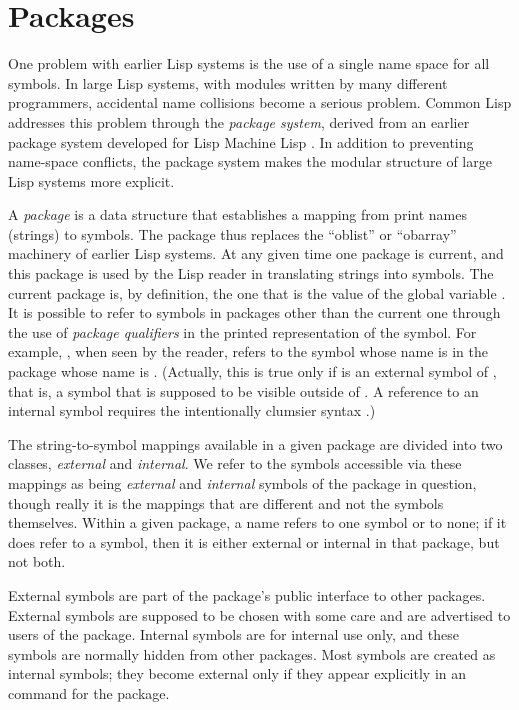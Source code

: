 
\clearpage\def\pagestatus{ULTIMATE}

\chapter{Packages}
\label{XPACK}


One problem with earlier Lisp systems is the use of a single name space
for all symbols.  In large Lisp systems, with modules written by many
different programmers, accidental name collisions become a serious
problem.  Common Lisp addresses this problem through the {\it package system},
derived from an earlier package system developed for
Lisp Machine Lisp \cite{BLUE-LISPM}.
In addition to preventing name-space conflicts, the
package system makes the modular structure of large Lisp systems more
explicit.

A {\it package} is a data structure that establishes a mapping from print
names (strings) to symbols.  The package thus replaces the ``oblist'' or
``obarray'' machinery of earlier Lisp systems.  At any given time one
package is current, and this package is used by the Lisp reader in
translating strings into symbols.  The current package is, by definition,
the one that is the
value of the global variable .  It is possible to refer to
symbols in packages other than the current one through the use of
{\it package qualifiers} in the printed representation of the symbol.
For example, , when seen by the reader,
refers to the symbol whose name is
 in the package whose name is .
(Actually, this is true only if  is an external symbol of ,
that is, a symbol that is supposed to be visible outside of .
A reference to an internal symbol requires the intentionally
clumsier syntax .)

The string-to-symbol mappings available in a given package are divided
into two classes, {\it external} and {\it internal}.  We refer to the
symbols accessible via these mappings as being {\it external} and
{\it internal} symbols of the package in question, though really it is the
mappings that are different and not the symbols themselves.  Within a
given package, a name refers to one symbol or to none; if it does refer
to a symbol, then it is either external or internal in that
package, but not both.

External symbols are part of the package's public interface to other
packages.  External symbols are supposed to be chosen with some care and are
advertised to users of the package.  Internal symbols are for internal
use only, and these symbols are normally hidden from other packages.
Most symbols are created as internal symbols; they become external only
if they appear explicitly in an  command for the package.


